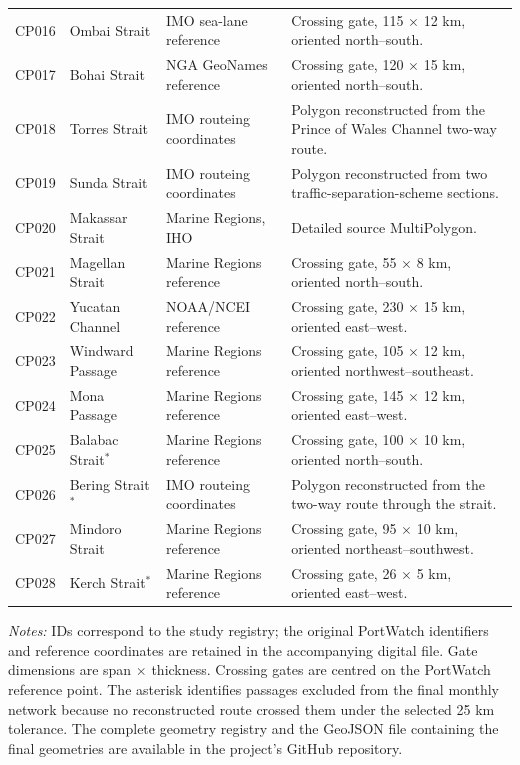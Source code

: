 \documentclass[pdftex,12pt,openright,a4paper,oneside]{book}
\begin{document}
\begin{longtable}{@{}p{}p{}p{}p{}@{}}
CP016 & Ombai Strait & IMO sea-lane reference & Crossing gate, 115 $\times$ 12 km, oriented north--south. \\
CP017 & Bohai Strait & NGA GeoNames reference & Crossing gate, 120 $\times$ 15 km, oriented north--south. \\
CP018 & Torres Strait & IMO routeing coordinates & Polygon reconstructed from the Prince of Wales Channel two-way route. \\
CP019 & Sunda Strait & IMO routeing coordinates & Polygon reconstructed from two traffic-separation-scheme sections. \\
CP020 & Makassar Strait & Marine Regions, IHO & Detailed source MultiPolygon. \\
CP021 & Magellan Strait & Marine Regions reference & Crossing gate, 55 $\times$ 8 km, oriented north--south. \\
CP022 & Yucatan Channel & NOAA/NCEI reference & Crossing gate, 230 $\times$ 15 km, oriented east--west. \\
CP023 & Windward Passage & Marine Regions reference & Crossing gate, 105 $\times$ 12 km, oriented northwest--southeast. \\
CP024 & Mona Passage & Marine Regions reference & Crossing gate, 145 $\times$ 12 km, oriented east--west. \\
CP025 & Balabac Strait$^{*}$ & Marine Regions reference & Crossing gate, 100 $\times$ 10 km, oriented north--south. \\
CP026 & Bering Strait$^{*}$ & IMO routeing coordinates & Polygon reconstructed from the two-way route through the strait. \\
CP027 & Mindoro Strait & Marine Regions reference & Crossing gate, 95 $\times$ 10 km, oriented northeast--southwest. \\
CP028 & Kerch Strait$^{*}$ & Marine Regions reference & Crossing gate, 26 $\times$ 5 km, oriented east--west. \\
\end{longtable}
\normalsize

\noindent\footnotesize
\emph{Notes:} IDs correspond to the study registry; the original
PortWatch identifiers and reference coordinates are retained in the
accompanying digital file. Gate dimensions are span $\times$
thickness. Crossing gates are centred on the PortWatch reference point. 
The asterisk identifies passages excluded from the final monthly 
network because no reconstructed route crossed them under the selected 25 km tolerance. 
The complete geometry registry and the GeoJSON file containing the final geometries 
are available in the project’s GitHub repository.
\normalsize
\end{document}

